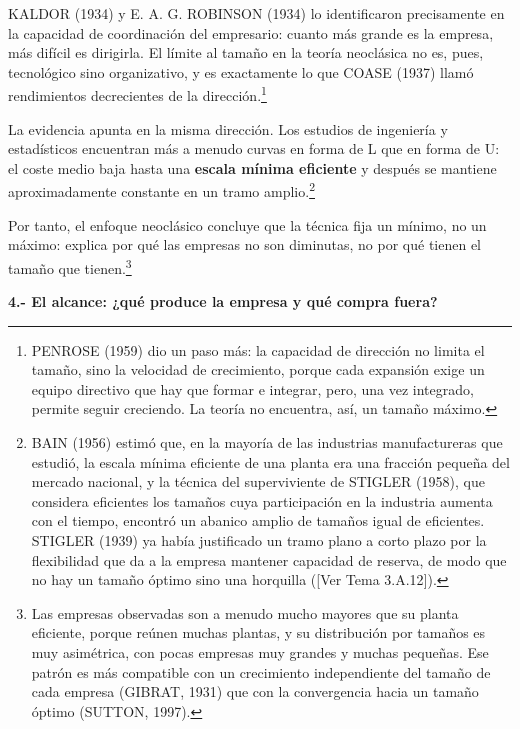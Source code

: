 \documentclass[10pt,a4paper]{article}
\newcommand{\authorfont}[1]{{\fontfamily{EBGaramond-TLF}\selectfont #1}}
\begin{document}
KALDOR (1934) y E. A. G. ROBINSON (1934) lo identificaron precisamente en la capacidad de coordinación del empresario: cuanto más grande es la empresa, más difícil es dirigirla. El límite al tamaño en la teoría neoclásica no es, pues, tecnológico sino organizativo, y es exactamente lo que COASE (1937) llamó rendimientos decrecientes de la dirección.\footnote{%
  PENROSE (1959) dio un paso más: la capacidad de dirección no limita el tamaño, sino la velocidad de crecimiento, porque cada expansión exige un equipo directivo que hay que formar e integrar, pero, una vez integrado, permite seguir creciendo. La teoría no encuentra, así, un tamaño máximo.
}

La evidencia apunta en la misma dirección. Los estudios de ingeniería y estadísticos encuentran más a menudo curvas en forma de L que en forma de U: el coste medio baja hasta una \textbf{escala mínima eficiente} y después se mantiene aproximadamente constante en un tramo amplio.\footnote{%
    BAIN (1956) estimó que, en la mayoría de las industrias manufactureras que estudió, la escala mínima eficiente de una planta era una fracción pequeña del mercado nacional, y la técnica del superviviente de STIGLER (1958), que considera eficientes los tamaños cuya participación en la industria aumenta con el tiempo, encontró un abanico amplio de tamaños igual de eficientes. STIGLER (1939) ya había justificado un tramo plano a corto plazo por la flexibilidad que da a la empresa mantener capacidad de reserva, de modo que no hay un tamaño óptimo sino una horquilla ([\authorfont{Ver Tema 3.A.12}]).
} 

Por tanto, el enfoque neoclásico concluye que la técnica fija un mínimo, no un máximo: explica por qué las empresas no son diminutas, no por qué tienen el tamaño que tienen.\footnote{%
  Las empresas observadas son a menudo mucho mayores que su planta eficiente, porque reúnen muchas plantas, y su distribución por tamaños es muy asimétrica, con pocas empresas muy grandes y muchas pequeñas. Ese patrón es más compatible con un crecimiento independiente del tamaño de cada empresa (GIBRAT, 1931) que con la convergencia hacia un tamaño óptimo (SUTTON, 1997).
}

\textbf{4.- El alcance: ¿qué produce la empresa y qué compra fuera?}
\end{document}
